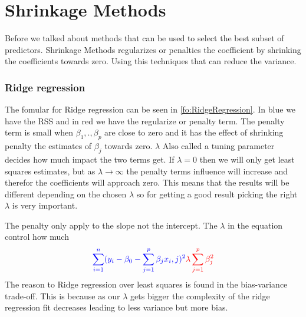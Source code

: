 \chapter{Shrinkage Methods} \label{ch:shrinkageMethods}
Before we talked about methods that can be used to select the best subset of predictors. Shrinkage Methods regularizes or penalties the coefficient by shrinking the coefficients towards zero. Using this techniques that can reduce the variance. 

\subsection{Ridge regression}

The fomular for Ridge regression can be seen in \ref{fo:RidgeRegression}. In blue we have the RSS and in red we have the regularize or penalty term. The penalty term is small when $\beta_1, . ,\beta_p$ are close to zero and it has the effect of shrinking penalty the estimates of $\beta_j$ towards zero. $\lambda$ Also called a tuning parameter decides how much impact the two terms get. If $\lambda = 0$ then we will only get least squares estimates, but as $ \lambda \to \infty$ the penalty terms influence will increase and therefor the coefficients will approach zero. This means that the results will be different depending on the chosen $\lambda$ so for getting a good result picking the right $\lambda$ is very important.

The penalty only apply to the slope not the intercept. The $\lambda$ in the equation control how much 
\begin{align}\label{fo:RidgeRegression}
\color{blue} \sum_{i=1}^{n} ( y_i - \beta_0 - \sum_{j=1}^{p} \beta_j x_i,j )^2  \color{red} \lambda \sum_{j=1}^{p} \beta^2_j 
\end{align}
The reason to Ridge regression over least squares is found in the bias-variance
trade-off. This is because as our $\lambda$ gets bigger the complexity of the ridge regression fit decreases leading to less variance but more bias.

